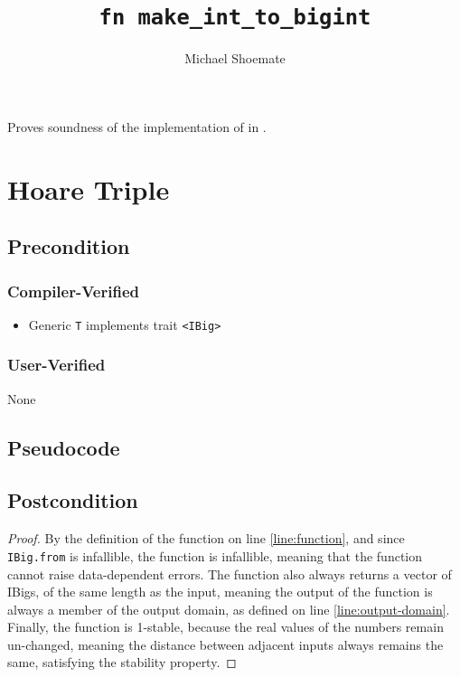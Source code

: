 \documentclass{article}
\title{\texttt{fn make\_int\_to\_bigint}}
\author{Michael Shoemate}
\date{}
\begin{document}
\maketitle

\contrib
Proves soundness of the implementation of  in .

\section{Hoare Triple}
\subsection*{Precondition}
\subsubsection*{Compiler-Verified}

\begin{itemize}
    \item Generic \texttt{T} implements trait \texttt{<IBig>}
\end{itemize}

\subsubsection*{User-Verified}
None

\subsection*{Pseudocode}


\subsection*{Postcondition}
\begin{theorem}
\end{theorem}

\begin{proof}
    By the definition of the function on line \ref{line:function},
    and since \texttt{IBig.from} is infallible, the function is infallible, 
    meaning that the function cannot raise data-dependent errors.
    The function also always returns a vector of IBigs, of the same length as the input, 
    meaning the output of the function is always a member of the output domain,
    as defined on line \ref{line:output-domain}.
    Finally, the function is 1-stable, because the real values of the numbers remain un-changed,
    meaning the distance between adjacent inputs always remains the same, satisfying the stability property.
\end{proof}
\end{document}
